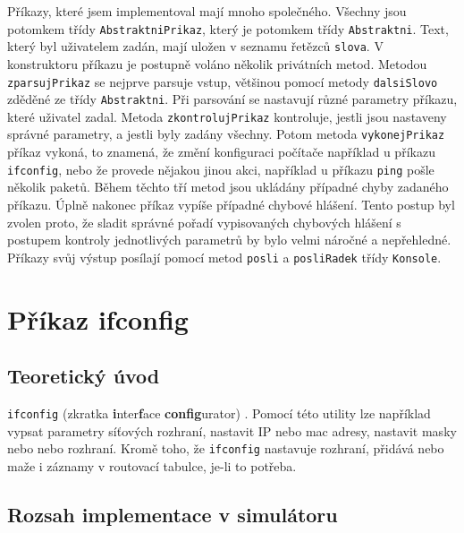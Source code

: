 Příkazy, které jsem implementoval mají mnoho společného. Všechny jsou potomkem třídy \verb|AbstraktniPrikaz|, který je potomkem třídy \verb|Abstraktni|. Text, který byl uživatelem zadán, mají uložen v seznamu řetězců \verb|slova|. V konstruktoru příkazu je postupně voláno několik privátních metod. Metodou \verb|zparsujPrikaz| se nejprve parsuje vstup, většinou pomocí metody \verb|dalsiSlovo| zděděné ze třídy \verb|Abstraktni|. Při parsování se nastavují různé parametry příkazu, které uživatel zadal. Metoda \verb|zkontrolujPrikaz| kontroluje, jestli jsou nastaveny správné parametry, a jestli byly zadány všechny. Potom metoda \verb|vykonejPrikaz| příkaz vykoná, to znamená, že změní konfiguraci počítače například u příkazu \verb|ifconfig|, nebo že provede nějakou jinou akci, například u příkazu \verb|ping| pošle několik paketů. Během těchto tří metod jsou ukládány případné chyby zadaného příkazu. Úplně nakonec příkaz vypíše případné chybové hlášení. Tento postup byl zvolen proto, že sladit správné pořadí vypisovaných chybových hlášení s postupem kontroly jednotlivých parametrů by bylo velmi náročné a nepřehledné. Příkazy svůj výstup posílají pomocí metod \verb|posli| a \verb|posliRadek| třídy \verb|Konsole|.




\section{Příkaz ifconfig}


\subsection{Teoretický úvod}

\verb|ifconfig| (zkratka \textbf{i}nter\textbf{f}ace \textbf{config}urator) \cite{wiki_ifconfig}. Pomocí této utility lze například vypsat parametry síťových rozhraní, nastavit IP nebo mac adresy, nastavit masky nebo  nebo  rozhraní. Kromě toho, že \verb|ifconfig| nastavuje rozhraní, přidává nebo maže i záznamy v routovací tabulce, je-li to potřeba.


\subsection{Rozsah implementace v simulátoru}

